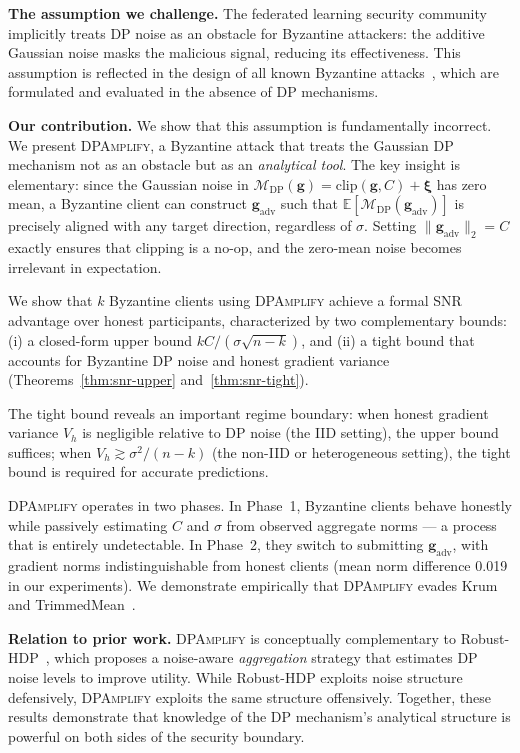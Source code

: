 \documentclass[conference]{IEEEtran}
\begin{document}
\textbf{The assumption we challenge.} The federated
learning security community implicitly treats DP
noise as an obstacle for Byzantine attackers: the
additive Gaussian noise masks the malicious signal,
reducing its effectiveness. This assumption is
reflected in the design of all known Byzantine
attacks~\cite{baruch2019little,
shejwalkar2021manipulating}, which are formulated
and evaluated in the absence of DP mechanisms.

\textbf{Our contribution.} We show that this
assumption is fundamentally incorrect. We present
\textsc{DPAmplify}, a Byzantine attack that treats
the Gaussian DP mechanism not as an obstacle but
as an \emph{analytical tool}. The key insight is
elementary: since the Gaussian noise in
$\mathcal{M}_{\mathrm{DP}}(\mathbf{g})
= \mathrm{clip}(\mathbf{g}, C) + \boldsymbol{\xi}$
has zero mean, a Byzantine client can construct
$\mathbf{g}_{\mathrm{adv}}$ such that
$\mathbb{E}[\mathcal{M}_{\mathrm{DP}}
(\mathbf{g}_{\mathrm{adv}})]$ is precisely aligned
with any target direction, regardless of $\sigma$.
Setting $\|\mathbf{g}_{\mathrm{adv}}\|_2 = C$
exactly ensures that clipping is a no-op, and the
zero-mean noise becomes irrelevant in expectation.

We show that $k$ Byzantine clients using
\textsc{DPAmplify} achieve a formal SNR advantage
over honest participants, characterized by two
complementary bounds:
(i) a closed-form upper bound
$kC/(\sigma\sqrt{n-k})$, and
(ii) a tight bound that accounts for Byzantine
DP noise and honest gradient variance
(Theorems~\ref{thm:snr-upper}
and~\ref{thm:snr-tight}).

The tight bound reveals an important regime boundary:
when honest gradient variance $V_h$ is negligible
relative to DP noise (the IID setting), the upper
bound suffices; when $V_h \gtrsim \sigma^2/(n-k)$
(the non-IID or heterogeneous setting), the tight
bound is required for accurate predictions.

\textsc{DPAmplify} operates in two phases. In
Phase~1, Byzantine clients behave honestly while
passively estimating $C$ and $\sigma$ from observed
aggregate norms --- a process that is entirely
undetectable. In Phase~2, they switch to submitting
$\mathbf{g}_{\mathrm{adv}}$, with gradient norms
indistinguishable from honest clients
(mean norm difference 0.019 in our experiments).
We demonstrate empirically that \textsc{DPAmplify}
evades Krum~\cite{blanchard2017machine} and
TrimmedMean~\cite{yin2018byzantine}.

\textbf{Relation to prior work.}
\textsc{DPAmplify} is conceptually complementary to
Robust-HDP~\cite{malekmohammadi2024robusthdp}, which
proposes a noise-aware \emph{aggregation} strategy
that estimates DP noise levels to improve utility.
While Robust-HDP exploits noise structure defensively,
\textsc{DPAmplify} exploits the same structure
offensively. Together, these results demonstrate that
knowledge of the DP mechanism's analytical structure
is powerful on both sides of the security boundary.
\end{document}
